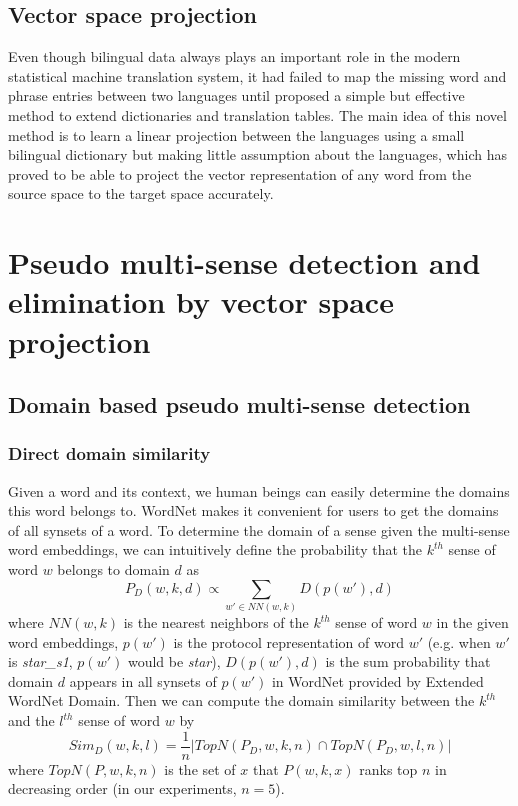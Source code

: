 \documentclass[11pt]{article}
\begin{document}
\subsection{Vector space projection}
Even though bilingual data always plays an important role in the modern statistical machine translation system, it had failed to map the missing word and phrase entries between two languages until  proposed a simple but effective method to extend dictionaries and translation tables. The main idea of this novel method is to learn a linear projection between the languages using a small bilingual dictionary but making little assumption about the languages, which has proved to be able to project the vector representation of any word from the source space to the target space accurately.
\section{Pseudo multi-sense detection and elimination by vector space projection}
\subsection{Domain based pseudo multi-sense detection}
\subsubsection{Direct domain similarity}
\par
Given a word and its context, we human beings can easily determine the domains this word belongs to. WordNet makes it convenient for users to get the domains of all synsets of a word. To determine the domain of a sense given the multi-sense word embeddings, we can intuitively define the probability that the $k^{th}$ sense of word $w$ belongs to domain $d$ as 
\begin{equation} \label{pdomain}
P_D(w, k, d) \propto  {\sum_{w' \in NN(w, k)} D(p(w'), d)}
\end{equation}
where $NN(w,k)$ is the nearest neighbors of the $k^{th}$ sense of word $w$ in the given word embeddings, $p(w')$ is the protocol representation of word $w'$ (e.g. when $w'$ is {\sl star\_s1}, $p(w')$ would be {\sl star}), $D(p(w'), d)$ is the sum probability that domain $d$ appears in all synsets of $p(w')$ in WordNet provided by Extended WordNet Domain. Then we can compute the domain similarity between the $k^{th}$ and the $l^{th}$ sense of word $w$ by
\begin{equation}
Sim_D(w,k,l) = \frac 1n|TopN(P_D,w,k,n) \cap TopN(P_D,w,l,n)| 
\end{equation}
where $TopN(P, w, k, n)$ is the set of $x$ that $P(w,k,x)$ ranks top $n$ in decreasing order (in our experiments, $n = 5$).
\end{document}
